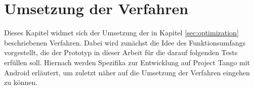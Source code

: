 \chapter{Umsetzung der Verfahren}

Dieses Kapitel widmet sich der Umsetzung der in Kapitel \ref{sec:optimization} beschriebenen Verfahren. Dabei wird zunächst die Idee des Funktionsumfangs vorgestellt, die der Prototyp in dieser Arbeit für die darauf folgenden Tests erfüllen soll. Hiernach werden Spezifika zur Entwicklung auf Project Tango mit Android erläutert, um zuletzt näher auf die Umsetzung der Verfahren eingehen zu können.









